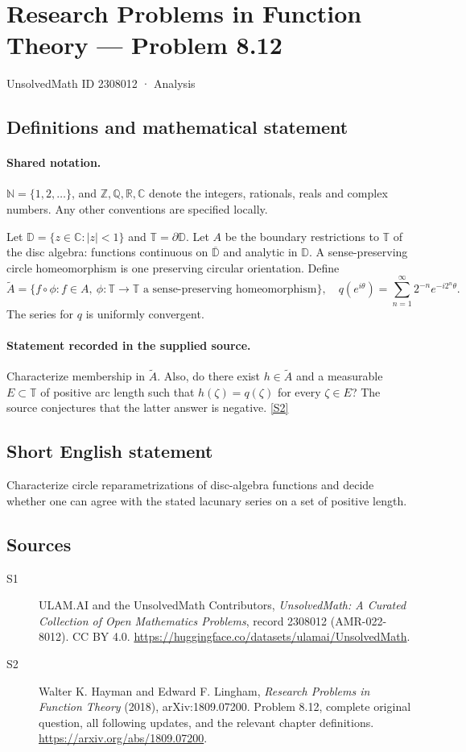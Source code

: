 \documentclass[11pt]{book}
\newcommand{\sref}[2]{\hyperlink{source:#1:#2}{[S#2]}}
\begin{document}
\setcounter{section}{2308011}
\section{Research Problems in Function Theory — Problem 8.12}\label{2308012}
{\small\sffamily UnsolvedMath ID 2308012 · Analysis}
\subsection{Definitions and mathematical statement}

\paragraph{Shared notation.}$\mathbb N=\{1,2,\ldots\}$, and $\mathbb Z,\mathbb Q,\mathbb R,\mathbb C$ denote the integers, rationals, reals and complex numbers. Any other conventions are specified locally.


Let $\mathbb D=\{z\in\mathbb C:|z|<1\}$ and $\mathbb T=\partial\mathbb D$. Let $A$ be the boundary restrictions to $\mathbb T$ of the disc algebra: functions continuous on $\overline{\mathbb D}$ and analytic in $\mathbb D$. A sense-preserving circle homeomorphism is one preserving circular orientation. Define \[\widetilde A=\{f\circ\phi:f\in A,\ \phi:\mathbb T\to\mathbb T\text{ a sense-preserving homeomorphism}\},\quad q(e^{i\theta})=\sum_{n=1}^{\infty}2^{-n}e^{-i2^n\theta}.\] The series for $q$ is uniformly convergent.
\paragraph{Statement recorded in the supplied source.}
Characterize membership in $\widetilde A$. Also, do there exist $h\in\widetilde A$ and a measurable $E\subset\mathbb T$ of positive arc length such that $h(\zeta)=q(\zeta)$ for every $\zeta\in E$? The source conjectures that the latter answer is negative. \sref{2308012}{2}
\subsection{Short English statement}
Characterize circle reparametrizations of disc-algebra functions and decide whether one can agree with the stated lacunary series on a set of positive length.
\subsection{Sources}
\begin{description}
\item[\hypertarget{source:2308012:1}{S1}] ULAM.AI and the UnsolvedMath Contributors, \emph{UnsolvedMath: A Curated Collection of Open Mathematics Problems}, record 2308012 (AMR-022-8012). CC BY 4.0. \url{https://huggingface.co/datasets/ulamai/UnsolvedMath}.
\item[\hypertarget{source:2308012:2}{S2}] Walter K. Hayman and Edward F. Lingham, \emph{Research Problems in Function Theory} (2018), arXiv:1809.07200. Problem 8.12, complete original question, all following updates, and the relevant chapter definitions. \url{https://arxiv.org/abs/1809.07200}.
\end{description}
\label{end:2308012}
\end{document}
